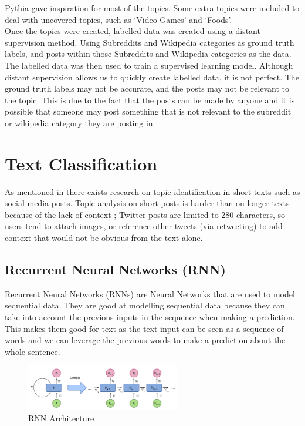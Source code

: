Pythia \cite{Pythia} gave inspiration for most of the topics. Some extra topics were included to deal with uncovered topics, such as
`Video Games' and `Foods'.\\

Once the topics were created, labelled data was created using a distant supervision method. Using Subreddits and Wikipedia categories
as ground truth labels, and posts within those Subreddits and Wikipedia categories as the data. The labelled data was then used 
to train a supervised learning model. Although distant supervision allows us to quickly create labelled data, it is not perfect. 
The ground truth labels may not be accurate, and the posts may not be relevant to the topic. This is due to the fact that the posts
can be made by anyone and it is possible that someone may post something that is not relevant to the subreddit or wikipedia category they
are posting in.
\section{Text Classification}

As mentioned in  there exists research on topic identification in short texts such as social media posts.
Topic analysis on short posts is harder than on longer texts because of the lack of context \cite{}; Twitter posts are limited to 280
characters, so users tend to attach images, or reference other tweets (via retweeting) to add context that would not be obvious from
the text alone.



\subsection{Recurrent Neural Networks (RNN)}
Recurrent Neural Networks (RNNs) are Neural Networks that are used to model sequential data. They are good at modelling sequential data
because they can take into account the previous inputs in the sequence when making a prediction. This makes them good for text
as the text input can be seen as a sequence of words and we can leverage the previous words to make a prediction about the whole sentence.\\
\begin{figure}[hbtp]
    \centering
    \includegraphics[width=0.6\textwidth]{../images/rnn.png}
    \caption{RNN Architecture}
    \label{fig:rnn}
\end{figure}

